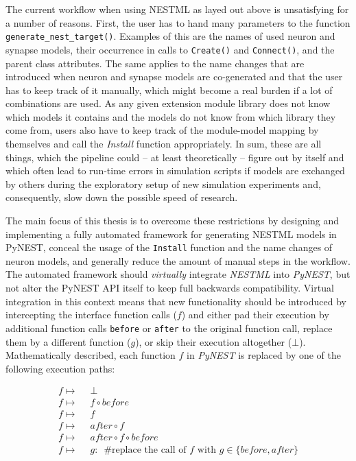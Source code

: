 The current workflow when using NESTML as layed out above is unsatisfying for a number of reasons. First, the user has to hand many parameters to the function \texttt{generate\_nest\_target()}. Examples of this are the names of used neuron and synapse models, their occurrence in calls to \texttt{Create()} and \texttt{Connect()}, and the parent class attributes. The same applies to the name changes that are introduced when neuron and synapse models are co-generated and that the user has to keep track of it manually, which might become a real burden if a lot of combinations are used. As any given extension module library does not know which models it contains and the models do not know from which library they come from, users also have to keep track of the module-model mapping by themselves and call the \emph{Install} function appropriately. In sum, these are all things, which the pipeline could -- at least theoretically -- figure out by itself and which often lead to run-time errors in simulation scripts if models are exchanged by others during the exploratory setup of new simulation experiments and, consequently, slow down the possible speed of research. 

The main focus of this thesis is to overcome these restrictions by designing and implementing a fully automated framework for generating NESTML models in PyNEST, conceal the usage of the \texttt{Install} function and the name changes of neuron models, and generally reduce the amount of manual steps in the workflow. The automated framework should \emph{virtually} integrate \emph{NESTML} into \emph{PyNEST}, but not alter the PyNEST API itself to keep full backwards compatibility. Virtual integration in this context means that new functionality should be introduced by intercepting the interface function calls ($f$) and either pad their execution by additional function calls \texttt{before} or \texttt{after} to the original function call, replace them by a different function ($g$), or skip their execution altogether ($\bot$). Mathematically described, each function $f$ in \emph{PyNEST} is replaced by one of the following execution paths:

\begin{align*}
  f \mapsto & \enspace\bot                                                                       \\
  f \mapsto & \enspace f \circ before                                                                   \\
  f \mapsto & \enspace f                                                                                \\
  f \mapsto & \enspace after \circ f                                                                    \\
  f \mapsto & \enspace after \circ f \circ before                                                       \\
  f \mapsto & \enspace g:\enspace \text{\#replace the call of } f \text{ with } g \in \{before, after\} \\
\end{align*}

